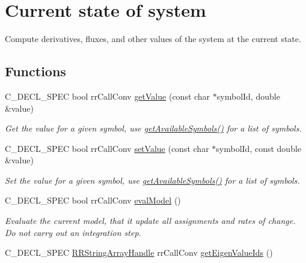 \hypertarget{group__state}{
\section{\-Current state of system}
\label{group__state}
}


\-Compute derivatives, fluxes, and other values of the system at the current state.  


\subsection*{\-Functions}
\begin{DoxyCompactItemize}
\item 
\-C\-\_\-\-D\-E\-C\-L\-\_\-\-S\-P\-E\-C bool rr\-Call\-Conv \hyperlink{group__state_gaee1e79b2afc717895d302c51b49aee47}{get\-Value} (const char $\ast$symbol\-Id, double \&value)
\begin{DoxyCompactList}\small\item\em \-Get the value for a given symbol, use \hyperlink{group__state_gab7164e3cb8db5f8fd8c066682ce8c62e}{get\-Available\-Symbols()} for a list of symbols. \end{DoxyCompactList}\item 
\-C\-\_\-\-D\-E\-C\-L\-\_\-\-S\-P\-E\-C bool rr\-Call\-Conv \hyperlink{group__state_ga8e92a279c4f313cb038f49cc04faed73}{set\-Value} (const char $\ast$symbol\-Id, const double \&value)
\begin{DoxyCompactList}\small\item\em \-Set the value for a given symbol, use \hyperlink{group__state_gab7164e3cb8db5f8fd8c066682ce8c62e}{get\-Available\-Symbols()} for a list of symbols. \end{DoxyCompactList}\item 
\-C\-\_\-\-D\-E\-C\-L\-\_\-\-S\-P\-E\-C bool rr\-Call\-Conv \hyperlink{group__state_ga3fbb7c2fab261f25a3871f1caf398ff1}{eval\-Model} ()
\begin{DoxyCompactList}\small\item\em \-Evaluate the current model, that it update all assignments and rates of change. \-Do not carry out an integration step. \end{DoxyCompactList}\item 
\-C\-\_\-\-D\-E\-C\-L\-\_\-\-S\-P\-E\-C \*
\hyperlink{rr__c__types_8h_a90941a6a2247bf7a8ec3d429729c5f9a}{\-R\-R\-String\-Array\-Handle} rr\-Call\-Conv \hyperlink{group__state_ga15fd0aa66d20ef3e733ec6fa28dbfc98}{get\-Eigen\-Value\-Ids} ()

\end{DoxyCompactItemize}
